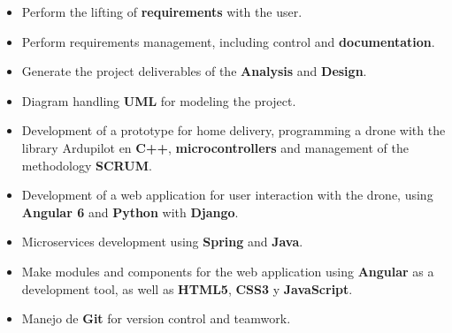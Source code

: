 \documentclass[letterpaper]{style} %
\begin{document}
\divider

\begin{itemize}
	\item Perform the lifting of \textbf{requirements} with the user.
	\item Perform requirements management, including control and \textbf{documentation}.
	\item Generate the project deliverables of the \textbf{Analysis} and  \textbf{Design}.
	\item Diagram handling  \textbf{UML} for modeling the project.
\end{itemize}

\divider

\begin{itemize}
	\item Development of a prototype for home delivery, programming a drone with the library  Ardupilot en \textbf{C++}, \textbf{microcontrollers} and management of the methodology \textbf{SCRUM}.
	\item Development of a web application for user interaction with the drone, using  \textbf{Angular 6} and  \textbf{Python} with  \textbf{Django}.
\end{itemize}

\divider

\begin{itemize}
	\item Microservices development using \textbf{Spring} and \textbf{Java}.
	\item Make modules and components for the web application using \textbf{Angular} as a development tool, as well as \textbf{HTML5}, \textbf{CSS3} y \textbf{JavaScript}.
	\item Manejo de \textbf{Git} for version control and teamwork.
\end{itemize}


\end{document}
